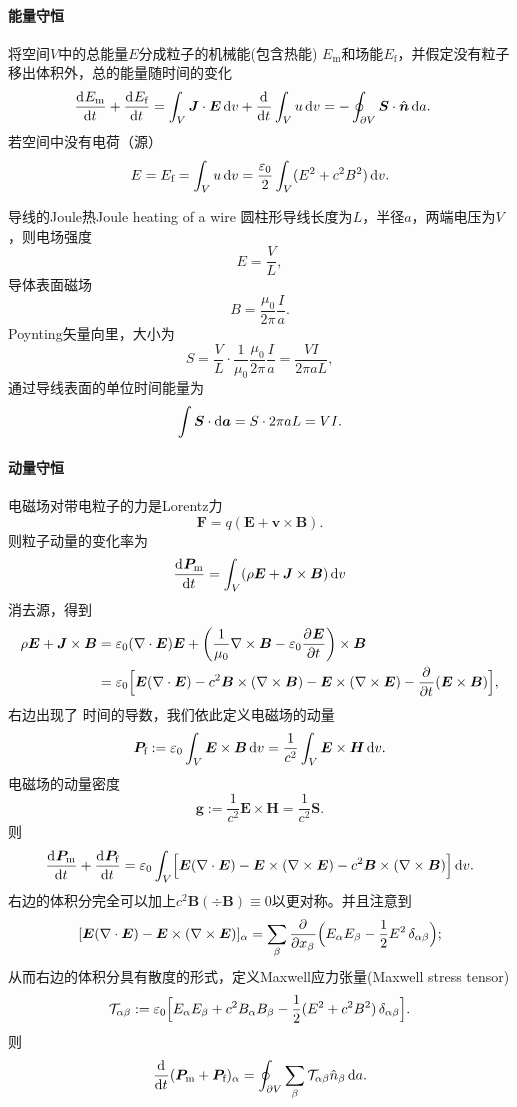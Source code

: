 \paragraph{能量守恒}
将空间$V$中的总能量$E$分成粒子的机械能(包含热能) $E_\text{m}$和场能$E_\text{f}$，并假定没有粒子移出体积外，总的能量随时间的变化
\begin{align*}
    \frac{\mathrm{d}^{{}}E_\text m}{\mathrm{d}{t}^{{}}}+\frac{\mathrm{d}^{{}}E_\text f}{\mathrm{d}{t}^{{}}}&=\int_V\bm J\cdot\bm E\mathop{}\!\mathrm{d} v+\frac{\mathrm{d}^{{}}}{\mathrm{d}{t}^{{}}}\int_Vu\mathop{}\!\mathrm{d} v=-\oint_{\partial V}\bm S\cdot\mathop{}\!\hat{\bm{n}}\mathop{}\!\mathrm{d} a.
\end{align*}
若空间中没有电荷（源）
\[
    E=E_\text f=\int_Vu\mathop{}\!\mathrm{d} v=\frac{\varepsilon_0}2\int_V(E^2+c^2B^2)\mathop{}\!\mathrm{d} v.
\]
\begin{example}{导线的Joule热}{Joule heating of a wire}
    圆柱形导线长度为$L$，半径$a$，两端电压为$V$，则电场强度
    \[
        E=\frac VL,
    \]
    导体表面磁场
    \[
        B=\frac{\mu_0}{2\pi}\frac Ia.
    \]
    Poynting矢量向里，大小为
    \[
        S=\frac VL\cdot\frac1{\mu_0}\frac{\mu_0}{2\pi}\frac Ia=\frac{VI}{2\pi aL},
    \]
    通过导线表面的单位时间能量为
    \[
        \int \bm S\cdot\mathop{}\!\mathrm{d}\bm a=S\cdot 2\pi aL=VI.
    \]
\end{example}
\paragraph{动量守恒}
电磁场对带电粒子的力是Lorentz力
\[
    \bm F=q(\bm E+\bm v\times\bm B).
\]
则粒子动量的变化率为
\[
    \frac{\mathrm{d}^{{}}\bm P_\text m}{\mathrm{d}{t}^{{}}}=\int_V(\rho\bm E+\bm J\times\bm B)\mathop{}\!\mathrm{d} v
\]
消去源，得到
\begin{align*}
    \rho\bm E+\bm J\times\bm B&=\varepsilon_0(\nabla\cdot\bm E)\bm E+\biggl(\frac1{\mu_0}\nabla\times\bm B-\varepsilon_0\frac{\partial^{{}}\bm E}{\partial{t}^{{}}}\biggr)\times\bm B\\
    &=\varepsilon_0\Bigl[\bm E(\nabla\cdot\bm E)-c^2\bm B\times(\nabla\times\bm B)-\bm E\times(\nabla\times\bm E)-\frac{\partial^{{}}}{\partial{t}^{{}}}(\bm E\times\bm B)\Bigr],
\end{align*}
右边出现了%
时间的导数，我们依此定义电磁场的动量
\[
    \bm P_\text f:=\varepsilon_0\int_V\bm E\times\bm B\mathop{}\!\mathrm{d} v=\frac1{c^2}\int_V\bm E\times\bm H\mathop{}\!\mathrm{d} v.
\]
电磁场的动量密度
\[
    \bm g:=\frac1{c^2}\bm E\times\bm H=\frac1{c^2}\bm S.
\]
则
\[
    \frac{\mathrm{d}^{{}}\bm P_\text m}{\mathrm{d}{t}^{{}}}+\frac{\mathrm{d}^{{}}\bm P_\text f}{\mathrm{d}{t}^{{}}}=\varepsilon_0\int_V\Bigl[\bm E(\nabla\cdot\bm E)-\bm E\times(\nabla\times\bm E)-c^2\bm B\times(\nabla\times\bm B)\Bigr]\mathop{}\!\mathrm{d} v.
\]
右边的体积分完全可以加上$c^2\bm B(\div\bm B)\equiv 0$以更对称。并且注意到
\[
    [\bm E(\nabla\cdot\bm E)-\bm E\times(\nabla\times\bm E)]_\alpha=\sum_\beta\frac{\partial^{{}}}{\partial{x_\beta}^{{}}}\Bigl(E_\alpha E_\beta-\frac12E^2\mathop{}\!\delta_{\alpha\beta}\Bigr);
\]
从而右边的体积分具有散度的形式，定义Maxwell应力张量(Maxwell stress tensor)
\[
    \mathcal T_{\alpha\beta}:=\varepsilon_0\Bigl[E_\alpha E_\beta+c^2B_\alpha B_\beta-\frac12(E^2+c^2B^2)\mathop{}\!\delta_{\alpha\beta}\Bigr].
\]
则
\[
    \frac{\mathrm{d}^{{}}}{\mathrm{d}{t}^{{}}}({\bm P_\text m}+{\bm P_\text f})_\alpha=\oint_{\partial V}\sum_\beta\mathcal  T_{\alpha\beta}\hat n_\beta\mathop{}\!\mathrm{d} a.
\]
